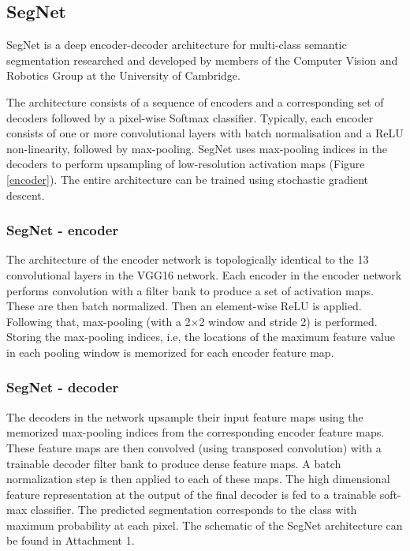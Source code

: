 \newpage
\subsection{SegNet}

SegNet is a deep encoder-decoder architecture for multi-class semantic segmentation researched and developed by members of the Computer Vision and Robotics Group at the University of Cambridge. \cite{segnet_tut}

The architecture consists of a sequence of encoders and a corresponding set of decoders followed by a pixel-wise Softmax classifier. Typically, each encoder consists of one or more convolutional layers with batch normalisation and a ReLU non-linearity, followed by max-pooling. SegNet uses max-pooling indices in the decoders to perform upsampling of low-resolution activation maps (Figure \ref{encoder}). The entire architecture can be trained using stochastic gradient descent. \cite{segnet_tut}

\subsubsection{SegNet - encoder}

The architecture of the encoder network is topologically identical to the 13 convolutional layers in the VGG16 network. Each encoder in the encoder network performs convolution with a filter bank to produce a set of activation maps. These are then batch normalized. Then an element-wise ReLU is applied. Following that, max-pooling (with a 2×2 window and stride 2) is performed. Storing the max-pooling indices, i.e, the locations of the maximum feature value in each pooling window is memorized for each encoder feature map. \cite{segnet}

\subsubsection{SegNet - decoder}

The decoders in the network upsample their input feature maps using the memorized max-pooling indices from the corresponding encoder feature maps. These feature maps are then convolved (using transposed convolution) with a trainable decoder filter bank to produce dense feature maps. A batch normalization step is then applied to each of these maps. The high dimensional feature representation at the output of the final decoder is fed to a trainable soft-max classifier. The predicted segmentation corresponds to the class with maximum probability at each pixel. \cite{segnet} The schematic of the SegNet architecture can be found in Attachment 1.


